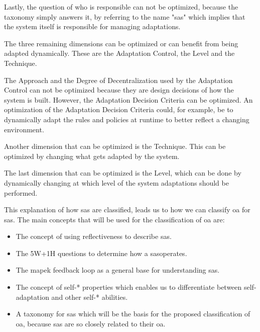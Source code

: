 \noindent Lastly, the question of who is responsible can not be optimized, because the taxonomy simply answers it,
by referring to the name "\acrshort{sas}" which implies that the system itself is responsible for managing adaptations.

\noindent The three remaining dimensions can be optimized or can benefit from being adapted dynamically.
These are the Adaptation Control, the Level and the Technique.

\noindent The Approach and the Degree of Decentralization used by the Adaptation Control can not be optimized 
because they are design decisions of how the system is built.
However, the Adaptation Decision Criteria can be optimized. An optimization of the Adaptation Decision Criteria
could, for example, be to dynamically adapt the rules and policies at runtime to better reflect a changing environment.

\noindent Another dimension that can be optimized is the Technique. 
This can be optimized by changing what gets adapted by the system.

\noindent The last dimension that can be optimized is the Level, which can be done by dynamically changing at which level of the system
adaptations should be performed.

\noindent This explanation of how \acrshort{sas} are classified,
leads us to how we can classify \acrshort{oa} for \acrshort{sas}.
The main concepts that will be used for the classification of \acrshort{oa} are:
\begin{itemize}[nosep]
    \item The concept of using reflectiveness to describe \acrshort{sas}.
    \item The 5W+1H questions to determine how a \acrshort{sas}operates.
    \item The \acrshort{mapek} feedback loop as a general base for understanding \acrshort{sas}.
    \item The concept of self-* properties which enables us to differentiate between self-adaptation
    and other self-* abilities.
    \item A taxonomy for \acrshort{sas} which will be the basis for the proposed classification of \acrshort{oa},
    because \acrshort{sas} are so closely related to their \acrshort{oa}.
\end{itemize}